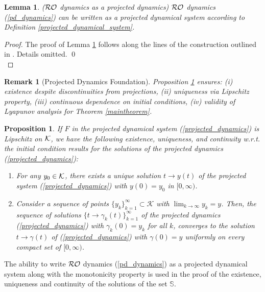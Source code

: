 \documentclass[journal,twoside,web]{ieeecolor}
\newcommand{\rev}[1]{\textcolor{revisionblue}{#1}}
\newtheorem{lemma}{Lemma}
\newtheorem{proposition}[theorem]{Proposition}
\newtheorem{remark}{Remark}
\begin{document}
\begin{lemma} \label{projected} (${\cal RO}$ dynamics as a projected dynamics)
${\cal RO}$ dynamics (\ref{pd_dynamics}) can be written as a projected dynamical system according to Definition \ref{projected_dynamical_system}.
\end{lemma}
\begin{proof}
The proof of Lemma \ref{projected} follows along the lines of the construction outlined in \cite{cherukuri2016}. Details omitted. \qed\\
\end{proof}

\begin{remark}[\rev{Projected Dynamics Foundation}]
\rev{Proposition \ref{proposition_projected} ensures: (i) existence despite discontinuities from projections, (ii) uniqueness via Lipschitz property, (iii) continuous dependence on initial conditions, (iv) validity of Lyapunov analysis for Theorem \ref{maintheorem}.}
\end{remark}

\begin{proposition} \label{proposition_projected}
If $F$ in the projected dynamical system (\ref{projected_dynamics}) is Lipschitz on ${\cal K}$, we have the following existence, uniqueness, and continuity w.r.t. the initial condition results for the solutions of the projected dynamics (\ref{projected_dynamics}):
\begin{enumerate}
\item For any $y_{0} \in {\cal K}$, there exists a unique solution $t \rightarrow y(t)$ of the projected system (\ref{projected_dynamics}) with $y(0)=y_{0}$ in $[0,\infty)$.
\item Consider a sequence of points $\{y_{k}\}_{k=1}^\infty \subset {\mathcal K}$ with $\lim_{k \rightarrow \infty} y_k=y$. Then, the sequence of solutions $\{t \rightarrow \gamma_k(t)\}_{k=1}^\infty$ of the projected dynamics (\ref{projected_dynamics}) with $\gamma_k(0)=y_k$ for all $k$, converges to the solution $t \rightarrow \gamma(t)$ of (\ref{projected_dynamics}) with $\gamma(0)=y$ uniformly on every compact set of $[0,\infty)$.
\end{enumerate}
\end{proposition}
The ability to write ${\cal RO}$ dynamics (\ref{pd_dynamics}) as a projected dynamical system along with the monotonicity property is used in the proof of the existence, uniqueness and continuity of the solutions of the set ${\mathbb S}$.
\end{document}
